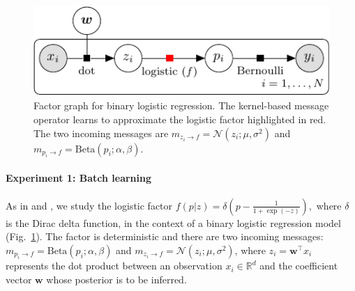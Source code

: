 \documentclass[english]{article}
\theoremstyle{plain}
\theoremstyle{plain}
\newcommand{\factor}{f}				%
\newcommand{\msg}[2]{m_{#1 \rightarrow #2}}			%
\newcommand{\figref}[1]{Fig.~\ref{#1}}
\begin{document}
\begin{figure}[ht]
\centering
\includegraphics[width=0.8\columnwidth]{img/binary_logistic_regression-crop}
%  
%  
\caption{Factor graph for binary logistic regression. 
The kernel-based message operator learns to approximate the logistic factor 
highlighted in red. The two incoming messages are 
$\msg{z_i}{\factor} = \mathcal{N}(z_i; \mu, \sigma^2)$ and 
$\msg{p_i}{\factor} = \text{Beta}(p_i; \alpha, \beta) $. 
}
\label{fig:factor_graph_binlog}
\end{figure}


\paragraph{Experiment 1: Batch learning} 
As in \citep{Heess2013} and \citep{Eslami2014}, we study the logistic factor 
$\factor(p|z)=\delta\left(p-\frac{1}{1+\exp(-z)}\right),$ 
%
%
where $\delta$ is the Dirac delta function, in the context of 
a binary logistic regression model  (\figref{fig:factor_graph_binlog}).
The factor is deterministic and there are two incoming messages: 
$\msg{p_i}{\factor} = \text{Beta}(p_i; \alpha, \beta) $ and 
$\msg{z_i}{\factor} = \mathcal{N}(z_i; \mu, \sigma^2)$, 
where $z_i = \boldsymbol{w}^\top x_i$ represents the dot product between an observation 
$x_i \in \mathbb{R}^d$ and the coefficient vector $\boldsymbol{w}$ whose posterior is 
to be inferred.
\end{document}
